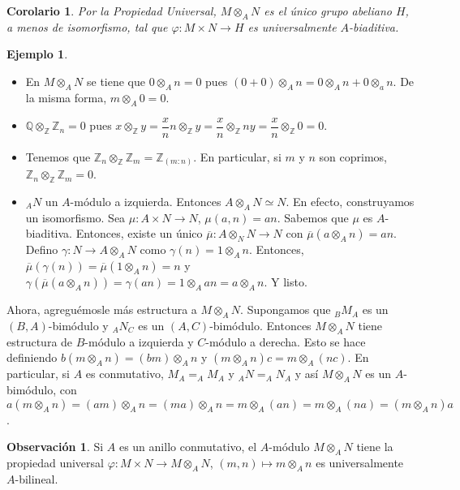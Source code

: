 \documentclass[12pt]{book}
\newtheorem{cor}[teo]{Corolario}
\theoremstyle{definition}
\newtheorem{obs}[teo]{Observación}
\newtheorem{ex}[teo]{Ejemplo}
\newcommand{\ZZ}{\mathbb{Z}}      %
\newcommand{\QQ}{\mathbb{Q}}
\begin{document}
\begin{cor}
Por la Propiedad Universal, $M\otimes_A N$ es el único grupo abeliano $H$, a menos de isomorfismo, tal que $\varphi:M\times N\to H$ es universalmente $A$-biaditiva.
\end{cor}

\begin{ex}
\begin{itemize}
\item En $M\otimes_A N$ se tiene que $0\otimes_A n=0$ pues $(0+0)\otimes_A n = 0\otimes_A n  + 0\otimes_a n$. De la misma forma, $m\otimes_A 0=0$.
\item $\QQ\otimes_\ZZ \ZZ_n = 0$ pues $x\otimes_\ZZ y = \dfrac{x}{n}n\otimes_\ZZ y = \dfrac{x}{n}\otimes_\ZZ ny = \dfrac{x}{n}\otimes_\ZZ 0 = 0$.
\item Tenemos que $\ZZ_n\otimes_\ZZ \ZZ_m = \ZZ_{(m:n)}$. En particular, si $m$ y $n$ son coprimos, $\ZZ_n\otimes_\ZZ \ZZ_m = 0$.
\item $_AN$ un $A$-módulo a izquierda. Entonces $A\otimes_A N \simeq N$. En efecto, construyamos un isomorfismo. Sea $\mu:A\times N\to N$, $\mu(a,n)=an$. Sabemos que $\mu$ es $A$-biaditiva. Entonces, existe un único $\overline{\mu}:A\otimes_N N\to N$ con $\overline{\mu}(a\otimes_A n)=an$. Defino $\gamma: N\to A\otimes_A N$ como $\gamma(n)=1\otimes_A n$. Entonces, $\overline{\mu}(\gamma(n)) = \overline{\mu}(1\otimes_A n)=n$ y $\gamma(\overline{\mu}(a\otimes_A n)) = \gamma(an) = 1\otimes_A an = a\otimes_A n$. Y listo.
\end{itemize}
\end{ex}

Ahora, agreguémosle más estructura a $M\otimes_A N$. Supongamos que $_BM_A$ es un $(B,A)$-bimódulo y $_AN_C$ es un $(A,C)$-bimódulo. Entonces $M\otimes_A N$ tiene estructura de $B$-módulo a izquierda y $C$-módulo a derecha. Esto se hace definiendo $b(m\otimes_A n) = (bm)\otimes_A n$ y $(m\otimes_A n)c = m\otimes_A (nc)$. En particular, si $A$ es conmutativo, $M_A= _AM_A$ y $_AN=_AN_A$ y así $M\otimes_A N$ es un $A$-bimódulo, con $a(m\otimes_A n) = (am)\otimes_A n = (ma)\otimes_A n = m\otimes_A (an) = m\otimes_A (na) = (m\otimes_A n)a$.

\begin{obs}
Si $A$ es un anillo conmutativo, el $A$-módulo $M\otimes_A N$ tiene la propiedad universal $\varphi:M\times N\to M\otimes_A N$, $(m,n)\mapsto m\otimes_A n$ es universalmente $A$-bilineal.
\end{obs}
\end{document}
